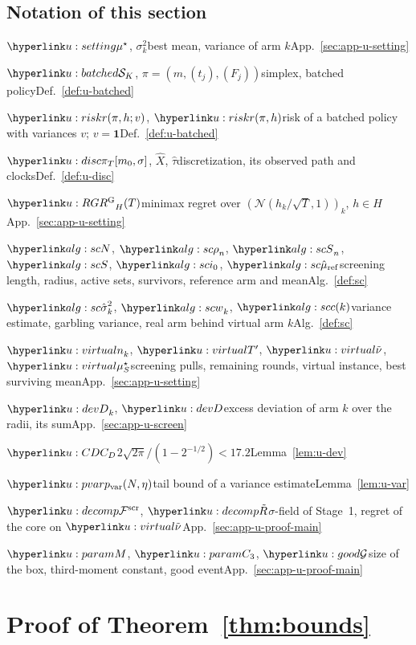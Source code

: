 \documentclass[11pt]{article}
\newcommand{\1}{\mathbf{1}}
\begin{document}
\subsection{Notation of this section}
\noindent $\umus$, $\sigma_k^2$\quad best mean, variance of arm $k$\hfill{\small App.~\ref{sec:app-u-setting}}\par
\noindent $\uSimp$, $\pi=(m,(t_j),(F_j))$\quad simplex, batched policy\hfill{\small Def.~\ref{def:u-batched}}\par
\noindent $\urk(\pi,h;v)$, $\urk(\pi,h)$\quad risk of a batched policy with variances $v$; $v=\mathbf 1$\hfill{\small Def.~\ref{def:u-batched}}\par
\noindent $\uDisc{\pi}{T}{m_0,\sigma}$, $\hat X$, $\hat\tau$\quad discretization, its observed path and clocks\hfill{\small Def.~\ref{def:u-disc}}\par
\noindent $\uRG_H(T)$\quad minimax regret over $(\mathcal N(h_k/\sqrt T,1))_k$, $h\in H$\hfill{\small App.~\ref{sec:app-u-setting}}\par
\noindent $\uN$, $\urho_n$, $\uS_n$, $\uS$, $\uio$, $\umuref$\quad screening length, radius, active sets, survivors, reference arm and mean\hfill{\small Alg.~\ref{def:sc}}\par
\noindent $\usigh_k^2$, $\uw_k$, $\uc(k)$\quad variance estimate, garbling variance, real arm behind virtual arm $k$\hfill{\small Alg.~\ref{def:sc}}\par
\noindent $\upulls_k$, $\uTp$, $\unu$, $\umusS$\quad screening pulls, remaining rounds, virtual instance, best surviving mean\hfill{\small App.~\ref{sec:app-u-setting}}\par
\noindent $\uD_k$, $\uD$\quad excess deviation of arm $k$ over the radii, its sum\hfill{\small App.~\ref{sec:app-u-screen}}\par
\noindent $\uCD$\quad $2\sqrt{2\pi}/(1-2^{-1/2})<17.2$\hfill{\small Lemma~\ref{lem:u-dev}}\par
\noindent $\upv(N,\eta)$\quad tail bound of a variance estimate\hfill{\small Lemma~\ref{lem:u-var}}\par
\noindent $\uF$, $\uRt$\quad $\sigma$-field of Stage~1, regret of the core on $\unu$\hfill{\small App.~\ref{sec:app-u-proof-main}}\par
\noindent $\uM$, $\uCt$, $\uG$\quad size of the box, third-moment constant, good event\hfill{\small App.~\ref{sec:app-u-proof-main}}\par

\section{Proof of Theorem~\ref{thm:bounds}}\label{sec:app-bounds}
\end{document}
